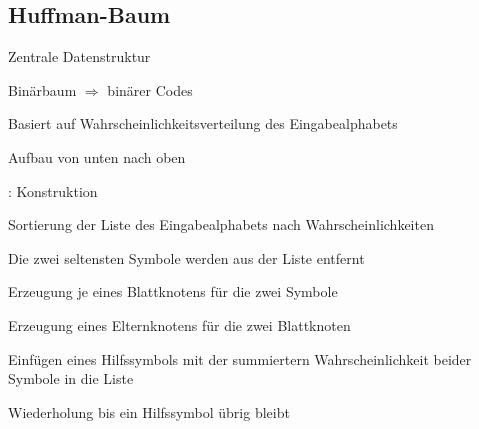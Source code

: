 \documentclass[xcolor=dvipsnames,presentation]{beamer}    %
\newenvironment{witemize}{\itemize\setlength{\itemsep}{1em}}{\enditemize}
\begin{document}
\subsection{Huffman-Baum}

\begin{frame}{\insertsubsection}
  \begin{witemize}
  \item Zentrale Datenstruktur
  \item Binärbaum $\Rightarrow$ binärer Codes
  \item Basiert auf Wahrscheinlichkeitsverteilung des Eingabealphabets
  \item Aufbau von unten nach oben
  \end{witemize}
\end{frame}

\begin{frame}{\insertsubsection: Konstruktion}
  \begin{witemize}
  \item Sortierung der Liste des Eingabealphabets nach Wahrscheinlichkeiten
  \item Die zwei seltensten Symbole werden aus der Liste entfernt
  \item Erzeugung je eines Blattknotens für die zwei Symbole
  \item Erzeugung eines Elternknotens für die zwei Blattknoten
  \item Einfügen eines Hilfssymbols mit der summiertern
    Wahrscheinlichkeit beider Symbole in die Liste
  \item Wiederholung bis ein Hilfssymbol übrig bleibt
  \end{witemize}
\end{frame}
\end{document}
